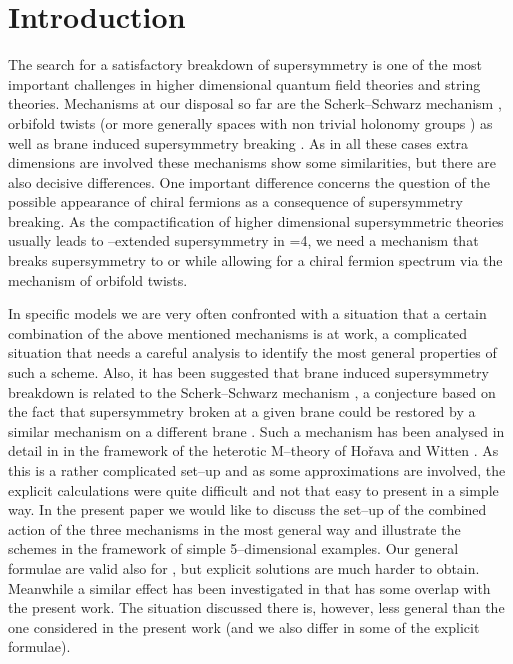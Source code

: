 \documentclass[a4paper,12pt]{article}
\begin{document}
\section{Introduction}

The search for a satisfactory breakdown of supersymmetry is one of the
most important challenges in higher dimensional quantum field theories
and string theories. Mechanisms at our disposal so far are the
Scherk--Schwarz mechanism \cite{Scherk:1978ta,Scherk:1979zr}, orbifold
twists \cite{Rohm:aq,Dixon:jw,Dixon:1986jc} (or more generally spaces
with non trivial holonomy groups \cite{Candelas:en}) as well as brane
induced supersymmetry breaking \cite{Horava:1996vs,Nilles:1997cm}. 
As in all these cases extra dimensions are involved these mechanisms
show some similarities, but there are also decisive differences. One
important difference concerns the question of the possible appearance
of chiral fermions as a consequence of supersymmetry breaking. As the
compactification of higher dimensional supersymmetric theories usually
leads to \coordHE{}--extended supersymmetry in \coordHE{}=4, we need a mechanism
that breaks supersymmetry to \coordHE{} or \coordHE{} while allowing for a
chiral fermion spectrum via the mechanism of orbifold twists.


In specific models we are very often confronted with a situation that
a certain combination of the above mentioned mechanisms is at work, a
complicated situation that needs a careful analysis to identify the
most general properties of such a scheme. Also, it has been suggested
that brane induced supersymmetry breakdown is related to the
Scherk--Schwarz mechanism \cite{Antoniadis:1997ic,Antoniadis:1997xk},  
a conjecture based on the fact that supersymmetry broken at a given
brane could be restored by a similar mechanism on a different brane
\cite{Horava:1996vs,Nilles:1998sx,Meissner:1999ja}. Such a 
mechanism has been analysed in detail in \cite{Meissner:1999ja} 
in the framework of the heterotic M--theory of Ho\v rava and
Witten \cite{Horava:1996ma}. As this is a rather complicated set--up
and as some approximations are involved, the explicit calculations
were quite difficult and not that easy to present in a simple way. In
the present paper we would like to discuss the set--up of the combined
action of the three mechanisms in the most general way and illustrate
the schemes in the framework of simple 5--dimensional examples. Our
general formulae are valid also for \coordHE{}, but explicit solutions are
much harder to obtain. Meanwhile a similar effect has been
investigated in \cite{Bagger:2001qi,Bagger:2001ep} that has some
overlap with the present work. The situation discussed there is,
however, less general than the one considered in the present work 
(and we also differ in some of the explicit formulae).
\end{document}
